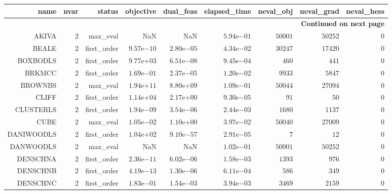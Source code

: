 \begin{longtable}{rrrrrrrrr}
\hline
name & nvar & status & objective & dual\_feas & elapsed\_time & neval\_obj & neval\_grad & neval\_hess \\\hline
\endhead
\hline
\multicolumn{9}{r}{{\bfseries Continued on next page}}\\
\hline
\endfoot
\endlastfoot
AKIVA & \(     2\) & max\_eval &       NaN &       NaN & \( 5.94\)e\(-01\) & \( 50001\) & \( 50252\) & \(     0\) \\
BEALE & \(     2\) & first\_order & \( 9.57\)e\(-10\) & \( 2.80\)e\(-05\) & \( 4.34\)e\(-02\) & \( 30247\) & \( 17420\) & \(     0\) \\
BOXBODLS & \(     2\) & first\_order & \( 9.77\)e\(+03\) & \( 6.51\)e\(-08\) & \( 9.45\)e\(-04\) & \(   460\) & \(   441\) & \(     0\) \\
BRKMCC & \(     2\) & first\_order & \( 1.69\)e\(-01\) & \( 2.37\)e\(-05\) & \( 1.20\)e\(-02\) & \(  9933\) & \(  5847\) & \(     0\) \\
BROWNBS & \(     2\) & max\_eval & \( 1.94\)e\(+11\) & \( 8.80\)e\(+09\) & \( 1.09\)e\(-01\) & \( 50044\) & \( 27094\) & \(     0\) \\
CLIFF & \(     2\) & first\_order & \( 1.14\)e\(+04\) & \( 2.17\)e\(+00\) & \( 9.30\)e\(-05\) & \(    91\) & \(    50\) & \(     0\) \\
CLUSTERLS & \(     2\) & first\_order & \( 1.94\)e\(-09\) & \( 3.54\)e\(-06\) & \( 2.44\)e\(-03\) & \(  1680\) & \(  1137\) & \(     0\) \\
CUBE & \(     2\) & max\_eval & \( 1.05\)e\(-02\) & \( 1.10\)e\(+00\) & \( 3.97\)e\(-02\) & \( 50040\) & \( 27009\) & \(     0\) \\
DANIWOODLS & \(     2\) & first\_order & \( 1.04\)e\(+02\) & \( 9.10\)e\(-57\) & \( 2.91\)e\(-05\) & \(     7\) & \(    12\) & \(     0\) \\
DANWOODLS & \(     2\) & max\_eval &       NaN &       NaN & \( 1.02\)e\(-01\) & \( 50001\) & \( 50252\) & \(     0\) \\
DENSCHNA & \(     2\) & first\_order & \( 2.36\)e\(-11\) & \( 6.02\)e\(-06\) & \( 1.58\)e\(-03\) & \(  1393\) & \(   976\) & \(     0\) \\
DENSCHNB & \(     2\) & first\_order & \( 4.19\)e\(-13\) & \( 1.30\)e\(-06\) & \( 6.11\)e\(-04\) & \(   586\) & \(   349\) & \(     0\) \\
DENSCHNC & \(     2\) & first\_order & \( 1.83\)e\(-01\) & \( 1.54\)e\(-03\) & \( 3.94\)e\(-03\) & \(  3469\) & \(  2159\) & \(     0\) \\

\end{longtable}
